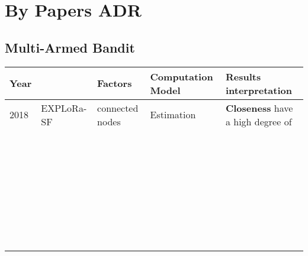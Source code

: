 \onecolumn
\setlength{\hoffset}{-.5in}

\section{By Papers ADR}

\subsection{Multi-Armed Bandit}
\begin{longtable}{lllll}
	Year  & \                                              & \textbf{Factors}              & \textbf{Computation Model}             & \textbf{Results interpretation}                               \\\hline
	2018  & EXPLoRa-SF \cite{cuomo_explora_2017}           & connected nodes               & Estimation                             & \textbf{Closeness} have a high degree of                      \\
	\     &                                                &                               &                                        &                                                               \\
	\     &                                                &                               &                                        &                                                               \\
	\     &                                                &                               &                                        &                                                               \\
	\     &                                                &                               &                                        &                                                               \\
	\     &                                                &                               &                                        &                                                               \\
	\     &                                                &                               &                                        &                                                               \\
	\     &                                                &                               &                                        &                                                               \\

\end{longtable}

